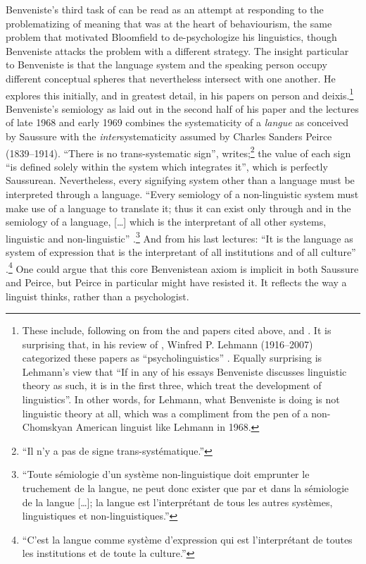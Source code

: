 \documentclass[output=paper]{langscibook}
\begin{document}
Benveniste's third task of \citeyear{Benveniste1954} can be read as an attempt at responding to the problematizing of meaning that was at the heart of behaviourism, the same problem that motivated Bloomfield to de-psychologize his linguistics, though Benveniste attacks the problem with a different strategy. The insight particular to Benveniste is that the language system and the speaking person occupy different conceptual spheres that nevertheless intersect with one another. He explores this initially, and in greatest detail, in his papers on person and deixis.\footnote{These include, following on from the \citeyear{Benveniste1946} and \citeyear{Benveniste1949} papers cited above, \citet{Benveniste1956nature} and \citet{Benveniste1958}. It is surprising that, in his review of \citet{Benveniste196674}, Winfred P. Lehmann (1916--2007) categorized these papers as ``psycholinguistics'' \citep{Lehmann1968}. Equally surprising is Lehmann's view that ``If in any of his essays Benveniste discusses linguistic theory as such, it is in the first three, which treat the development of linguistics''. In other words, for Lehmann, what Benveniste is doing is not linguistic theory at all, which was a compliment from the pen of a non-Chomskyan American linguist like Lehmann in 1968.} Benveniste's semiology as laid out in the second half of his \citeyear{Benveniste1969semiologie} paper and the lectures of late 1968 and early 1969 combines the systematicity of a \emph{langue} as conceived by Saussure with the \emph{inter}systematicity assumed by Charles Sanders Peirce (1839--1914). ``There is no trans-systematic sign'', \citet[53]{Benveniste1969semiologie} writes;\footnote{``Il n'y a pas de signe trans-systématique.''} the value of each sign ``is defined solely within the system which integrates it'', which is perfectly Saussurean. Nevertheless, every signifying system other than a language must be interpreted through a language. ``Every semiology of a non-linguistic system must make use of a language to translate it; thus it can exist only through and in the semiology of a language, […] which is the interpretant of all other systems, linguistic and non-linguistic'' \citep[60]{Benveniste1969semiologie}.\footnote{``Toute sémiologie d'un système non-linguistique doit emprunter le truchement de la langue, ne peut donc exister que par et dans la sémiologie de la langue […]; la langue est l'interprétant de tous les autres systèmes, linguistiques et non-linguistiques.''} And from his last lectures: ``It is the language as system of expression that is the interpretant of all institutions and of all culture'' \citep[83]{Benveniste2012}.\footnote{``C'est la langue comme système d’expression qui est l'interprétant de toutes les institutions et de toute la culture.''} One could argue that this core Benvenistean axiom is implicit in both Saussure and Peirce, but Peirce in particular might have resisted it. It reflects the way a linguist thinks, rather than a psychologist.
\end{document}

